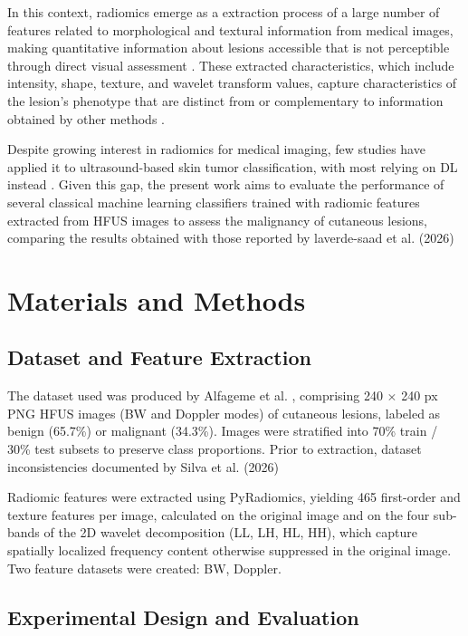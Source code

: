 \documentclass[12pt]{article}
\begin{document}
In this context, radiomics emerge as a extraction process of a large number of features related to morphological and textural information from medical images, making quantitative information about lesions accessible that is not perceptible through direct visual assessment \cite{Lambin2017}. These extracted characteristics, which include intensity, shape, texture, and wavelet transform values, capture characteristics of the lesion's phenotype that are distinct from or complementary to information obtained by other methods \cite{Lambin2017}.

Despite growing interest in radiomics for medical imaging, few studies have applied it to ultrasound-based skin tumor classification, with most relying on DL instead \cite{Surkov2024, Bibi2026, Czajkowska2021-2}. Given this gap, the present work aims to evaluate the performance of several classical machine learning classifiers trained with
radiomic features extracted from HFUS images to assess the malignancy of
cutaneous lesions, comparing the results obtained with those reported by laverde-saad et al. (2026)

\section{Materials and Methods}
\subsection{Dataset and Feature Extraction}
The dataset used was produced by Alfageme et al. \cite{Alfageme2022}, comprising 240 $\times$ 240 px PNG HFUS images (BW and Doppler modes) of cutaneous lesions, labeled as benign (65.7\%) or malignant (34.3\%). Images were stratified into 70\% train / 30\% test subsets to preserve class proportions. Prior to extraction, dataset inconsistencies documented by Silva et al. (2026)

Radiomic features were extracted using PyRadiomics, yielding 465 first-order and texture features per image, calculated on the original image and on the four sub-bands of the 2D wavelet decomposition (LL, LH, HL, HH), which capture spatially localized frequency content otherwise suppressed in the original image. Two feature datasets were created: BW, Doppler.

\subsection{Experimental Design and Evaluation}
\end{document}
